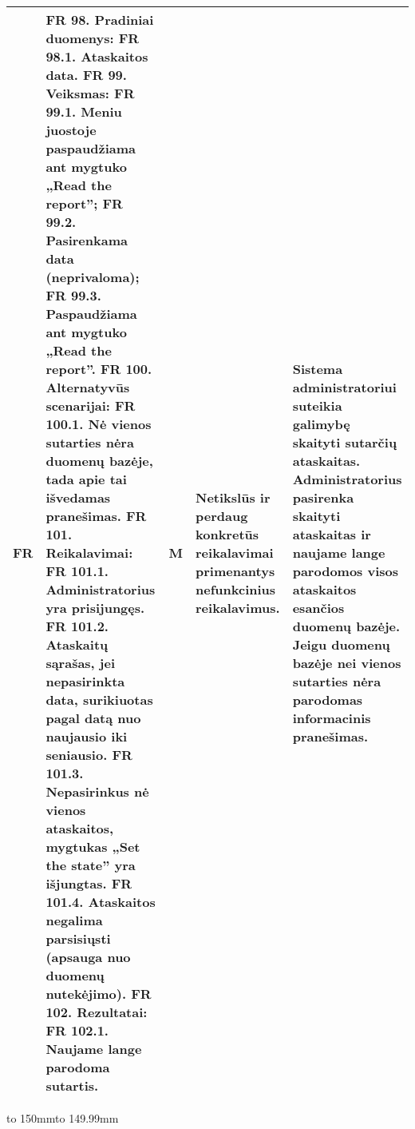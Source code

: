 \documentclass[oneside]{VUMIFPSkursinis}
\begin{document}
\begin{table}[htbp]


\begin{tabularx}{1\textwidth}{  |P{1cm}|X|c|p{3.5cm}|X| }  \hline

FR & 
FR 98. Pradiniai duomenys: 
FR 98.1. Ataskaitos data. 
FR 99. Veiksmas:
 FR 99.1. Meniu juostoje paspaudžiama ant mygtuko „Read the report”;
 FR 99.2. Pasirenkama data (neprivaloma);
 FR 99.3. Paspaudžiama ant mygtuko „Read the report”. 
FR 100. Alternatyvūs scenarijai:
FR 100.1. Nė vienos sutarties nėra duomenų bazėje, tada apie tai išvedamas 
pranešimas. 
FR 101. Reikalavimai: 
FR 101.1. Administratorius yra prisijungęs.
 FR 101.2. Ataskaitų sąrašas, jei nepasirinkta data, surikiuotas pagal datą nuo naujausio iki seniausio.
 FR 101.3. Nepasirinkus nė vienos ataskaitos, mygtukas „Set the state” yra išjungtas. 
FR 101.4. Ataskaitos negalima parsisiųsti (apsauga nuo duomenų nutekėjimo). 
FR 102. Rezultatai:
 FR 102.1. Naujame lange parodoma sutartis. 
& M & Netikslūs ir perdaug konkretūs reikalavimai primenantys nefunkcinius reikalavimus. &
Sistema administratoriui suteikia galimybę skaityti sutarčių ataskaitas. Administratorius pasirenka skaityti ataskaitas ir naujame lange parodomos visos ataskaitos esančios duomenų bazėje. Jeigu duomenų bazėje nei vienos sutarties nėra parodomas informacinis pranešimas. \\ \hline





\end{tabularx}

	
\end{table}

\hbox to 150mm{\hbox to 149.99mm{}}
\end{document}
